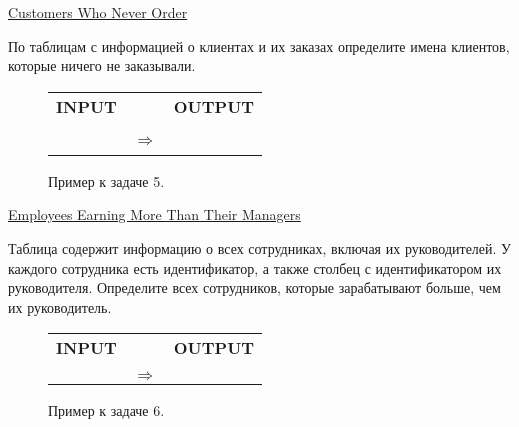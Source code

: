 \documentclass[10pt,fleqn]{article}
\newcounter{example}
\begin{document}
\begin{section}{\href{https://leetcode.com/problems/customers-who-never-order/}{Customers Who Never Order}}

По таблицам с информацией о клиентах и их заказах определите имена клиентов, которые ничего не заказывали.

\begin{figure}[!h]
    \centering
    \begin{tabular}{ccc}
        \textbf{INPUT} & & \textbf{OUTPUT} \\
        & & \\
         &  &  \\
         & $\Longrightarrow$ &  \\
         &  &  \\
     \end{tabular}
     \caption{Пример к задаче 5. \label{fig:task_05}}
\end{figure}

\end{section}


\begin{section}{\href{https://leetcode.com/problems/employees-earning-more-than-their-managers/}{Employees Earning More Than Their Managers}}

Таблица содержит информацию о всех сотрудниках, включая их руководителей. У каждого сотрудника есть идентификатор, а также столбец с идентификатором их руководителя. Определите всех сотрудников, которые
зарабатывают больше, чем их руководитель.

    \begin{figure}[!h]
        \centering
        \begin{tabular}{ccc}
            \textbf{INPUT} & & \textbf{OUTPUT} \\
            & & \\
             & $\Longrightarrow$ &  \\
         \end{tabular}
         \caption{Пример к задаче 6. \label{fig:task_06}}
    \end{figure}
    
\end{section}
\end{document}
